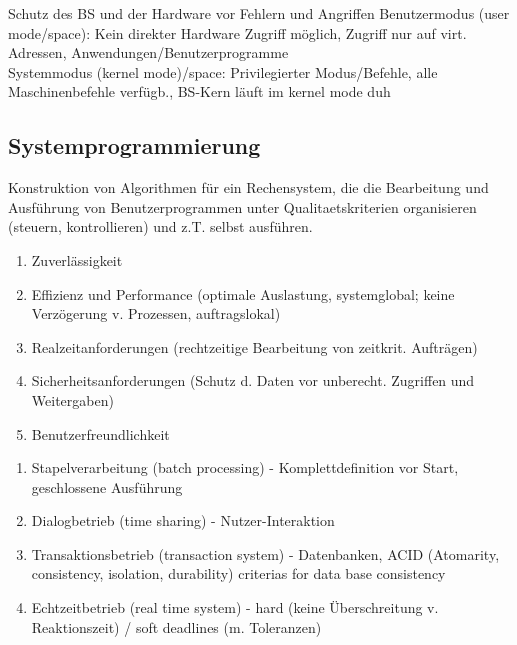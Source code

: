Schutz des BS und der Hardware vor Fehlern und Angriffen
Benutzermodus (user mode/space): Kein direkter Hardware Zugriff möglich, Zugriff nur auf virt. Adressen, Anwendungen/Benutzerprogramme \\ Systemmodus (kernel mode)/space: Privilegierter Modus/Befehle, alle Maschinenbefehle verfügb., BS-Kern läuft im kernel mode duh



\subsection{Systemprogrammierung}

\noindent Konstruktion von Algorithmen für ein Rechensystem, die die Bearbeitung und Ausführung von Benutzerprogrammen unter Qualitaetskriterien organisieren (steuern, kontrollieren) und z.T. selbst ausführen.

\begin{enumerate}
	\setlength\itemsep{0em}
	\item Zuverlässigkeit
	\item Effizienz und Performance (optimale Auslastung, systemglobal; keine Ver\-zögerung v. Prozessen, auftragslokal)
	\item Realzeitanforderungen (rechtzeitige Bearbeitung von zeitkrit. Aufträgen)
	\item Sicherheitsanforderungen (Schutz d. Daten vor unberecht. Zugriffen und Weiter\-gaben)
	\item Benutzerfreundlichkeit
\end{enumerate}

\begin{enumerate}
	\setlength\itemsep{0em}
	\item Stapelverarbeitung (batch processing) - Komplettdefinition vor Start, geschlossene Ausführung
	\item Dialogbetrieb (time sharing) - Nutzer-Interaktion
	\item Transaktionsbetrieb (transaction system) - Datenbanken, ACID (Atomarity, consistency, isolation, durability) criterias for data base consistency
	\item Echtzeitbetrieb (real time system) - hard (keine Überschreitung v. Reaktionszeit) / soft deadlines (m. Toleranzen)
\end{enumerate}

